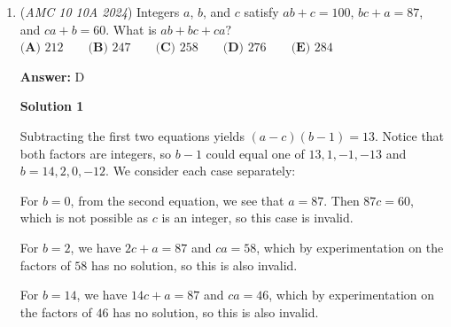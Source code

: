 \begin{enumerate}
 Since each kite is made from two $30^\circ$-$60^\circ$-$90^\circ$ triangles, we can extend the arrangement onto a grid of equilateral triangles with side length $1$.

 Each unit rhombus consists of two equilateral triangles, so its area is

 
 \[2\left(\frac{\sqrt3}{4}\right)=\frac{\sqrt3}{2}.\]

 \textbf{Step 2: Complete the parallelogram.}

 As shown by the blue outline, complete parallelogram $ABED$, with $C$ lying on the top side $DE$.

 The parallelogram contains $6$ columns and $3$ rows of unit rhombuses, giving a total of

 
 \[6\times3=18\]

 unit rhombuses.

 \textbf{Step 3: Take half the area!}

 Since $C$ lies on $DE$, which is parallel to $AB$, triangle $ABC$ has exactly half the area of parallelogram $ABED$.

 Therefore,

 
 \[[ABC]=\frac12\cdot18\cdot\frac{\sqrt3}{2}=\boxed{\frac{9\sqrt3}{2}}.\]



	\item (\textit{AMC 10 10A 2024}) Integers $a$, $b$, and $c$ satisfy $ab + c = 100$, $bc + a = 87$, and $ca + b = 60$. What is $ab + bc + ca?$
$\textbf{(A) }212 \qquad \textbf{(B) }247 \qquad \textbf{(C) }258 \qquad \textbf{(D) }276 \qquad \textbf{(E) }284 \qquad$

 \textbf{Answer: }D



\textbf{Solution 1}

Subtracting the first two equations yields $(a-c)(b-1)=13$. Notice that both factors are integers, so $b-1$ could equal one of $13,1,-1,-13$ and $b=14,2,0,-12$. We consider each case separately:

 For $b=0$, from the second equation, we see that $a=87$. Then $87c=60$, which is not possible as $c$ is an integer, so this case is invalid.

 For $b=2$, we have $2c+a=87$ and $ca=58$, which by experimentation on the factors of $58$ has no solution, so this is also invalid.

 For $b=14$, we have $14c+a=87$ and $ca=46$, which by experimentation on the factors of $46$ has no solution, so this is also invalid.


\end{enumerate}
